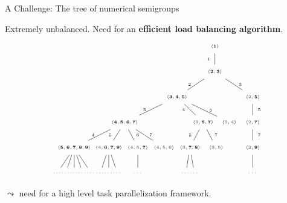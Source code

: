 \documentclass{beamer}
\begin{document}
\begin{frame}[fragile]{A Challenge: The tree of numerical semigroups}
\newcommand{\sgnode}[1]{{\bf \left<#1\right>}}
\newcommand{\gr}[1]{{\color{gray} #1}}

Extremely unbalanced. Need for an \textbf{efficient load balancing algorithm}.
\[\tiny
\begin{tikzpicture}[baseline={([yshift=-5cm]current bounding box.north)},
  scale=0.7,
  level distance=1.5cm, 
  inner sep=2mm,
  level/.style={sibling distance=1.55cm}]
    \node {$\sgnode{1}$}
    child {node {$\sgnode{2,3}$}
      child [sibling distance=4.5cm] {node {$\sgnode{3,4,5}$}
        child {node {$\sgnode{4,5,6,7}$}
          child [sibling distance=2cm]{node {$\sgnode{5,6,7,8,9}$}
            child[sibling distance=0.5cm] {node {$\dots$} edge from parent}
            child[sibling distance=0.5cm] {node {$\dots$} edge from parent}
            child[sibling distance=0.5cm] {node {$\dots$} edge from parent}
            child[sibling distance=0.5cm] {node {$\dots$} edge from parent}
            child[sibling distance=0.5cm] {node {$\dots$} edge from parent}
            edge from parent node [left] {4}}
          child [sibling distance=1.9cm]{node {$\sgnode{\gr 4,6,7,9}$}
            child[sibling distance=0.5cm] {node {$\dots$} edge from parent}
            child[sibling distance=0.5cm] {node {$\dots$} edge from parent}
            child[sibling distance=0.5cm] {node {$\dots$} edge from parent}
            edge from parent node [left] {5}}
          child {node {$\sgnode{\gr 4,\gr 5,7}$}
            child[sibling distance=0.5cm] {node {$\dots$} edge from parent}
            edge from parent node [right] {6}}
          child {node {$\sgnode{\gr 4,\gr 5,\gr 6}$}
            edge from parent node [right] {7}}
          edge from parent node [left] {3}
        }
        child{{} edge from parent[draw=none]}
        child{{} edge from parent[draw=none]}
        child {node {$\sgnode{\gr 3,5,7}$}
          child {node {$\sgnode{\gr 3,7,8}$}
            child[sibling distance=0.5cm] {node {$\dots$} edge from parent}
            child[sibling distance=0.5cm] {node {$\dots$} edge from parent}
            edge from parent node [left] {5}}
          child {node {$\sgnode{\gr 3,\gr 5}$} edge from parent node [right] {7}}
          edge from parent node [left] {4}
        }
        child {node {$\sgnode{\gr 3,\gr 4}$}
          edge from parent node [right] {5}
        }
        edge from parent node [left] {2}
      }
      child [sibling distance=4.5cm] {node {$\sgnode{\gr2,5}$}
        child {node {$\sgnode{\gr2,7}$}
          child {node {$\sgnode{\gr2,9}$}
            child[sibling distance=0.5cm] {node {$\dots$} edge from parent}
            edge from parent node [right] {7}
          }
          edge from parent node [right] {5}
        }
        edge from parent node [right] {3}
      }
      edge from parent node [left] {1}
    }
   ;
  \end{tikzpicture}
\]
\pause

$  \leadsto$ need for a high level task parallelization framework. 
\end{frame}
\end{document}
